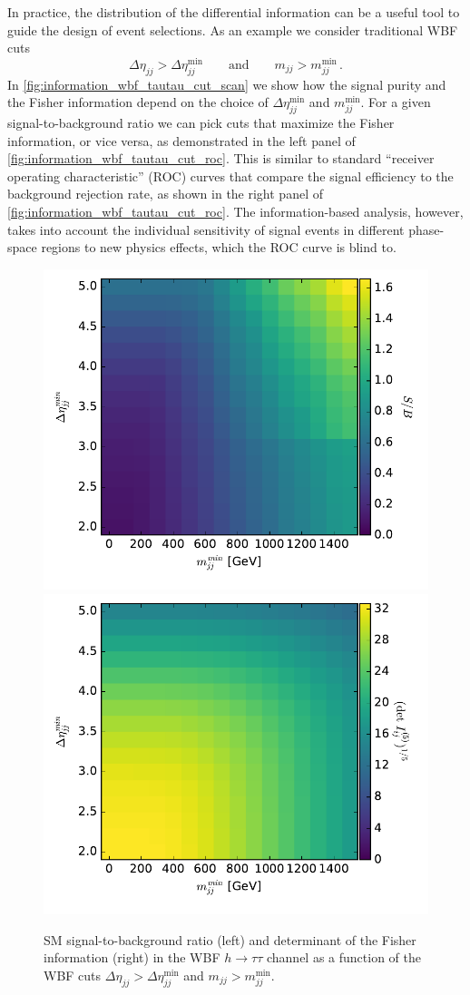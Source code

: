 In practice, the distribution of the differential information can be a
useful tool to guide the design of event selections. As an example we
consider traditional WBF cuts
%
\begin{equation}
  \Delta \eta_{jj} > \Delta \eta_{jj}^{\text{min}}
  \qquad \text{and} \qquad
  m_{jj} > m_{jj}^{\text{min}} \,.
\end{equation}
%
In \autoref{fig:information_wbf_tautau_cut_scan} we show how the
signal purity and the Fisher information depend on the choice of
$\Delta \eta_{jj}^{\text{min}}$ and $m_{jj}^{\text{min}}$. For a given
signal-to-background ratio we can pick cuts that maximize the Fisher
information, or vice versa, as demonstrated in the left panel of
\autoref{fig:information_wbf_tautau_cut_roc}.  This is similar to
standard ``receiver operating characteristic'' (ROC) curves that
compare the signal efficiency to the background rejection rate, as
shown in the right panel of
\autoref{fig:information_wbf_tautau_cut_roc}. The information-based
analysis, however, takes into account the individual sensitivity of
signal events in different phase-space regions to new physics effects,
which the ROC curve is blind to.
%

\begin{figure}
  \includegraphics[height=0.45 \textwidth]{fig/information/wbf_tautau_tunecuts_purity}%
  \includegraphics[height=0.45 \textwidth]{fig/information/wbf_tautau_tunecuts_information}%
  \caption{SM signal-to-background ratio (left) and determinant of the
    Fisher information (right) in the WBF $h \to \tau \tau$ channel as
    a function of the WBF cuts
    $\Delta \eta_{jj} > \Delta \eta_{jj}^{\text{min}}$ and
    $m_{jj} > m_{jj}^{\text{min}}$.}
  \label{fig:information_wbf_tautau_cut_scan}
\end{figure}

